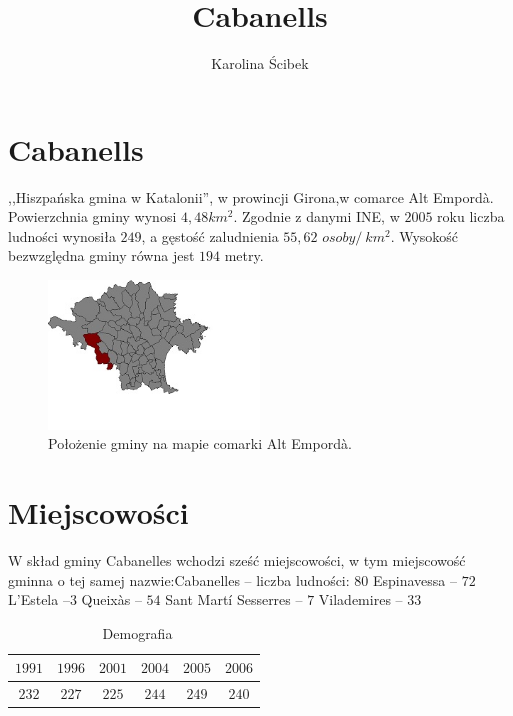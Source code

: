 \documentclass{article}
\title{Cabanells}
\author{Karolina Ścibek}
\begin{document}
\maketitle

\section{Cabanells}
,,Hiszpańska gmina w Katalonii'', w prowincji Girona,w comarce Alt Empordà.
Powierzchnia gminy wynosi $4,48km^2$. Zgodnie z danymi INE, w $2005$ roku liczba ludności wynosiła $249$, a gęstość zaludnienia $55,62$ $osoby/\ km^2$. Wysokość bezwzględna gminy równa jest $194$ metry.
\begin{figure}[h!]
\includegraphics[width=0.5\textwidth]{mapacabanelles.jpg}
\caption{Położenie gminy na mapie comarki Alt Empordà.}
\centering
\end{figure}


\section{Miejscowości}
W skład gminy Cabanelles wchodzi sześć miejscowości, w tym miejscowość gminna o tej samej nazwie:Cabanelles – liczba ludności: $80$
Espinavessa – $72$
L'Estela –$ 3$
Queixàs – $54$
Sant Martí Sesserres – $7$
Vilademires – $33$

\begin{table}[here]
\centering \caption{\ Demografia }
\begin{tabular}{cccccc}
$1991$ & $1996$ &  $2001$ &$2004$ & $2005$ & $2006$\\
\hline
$232$ & $227$ & $225$ & $244$ & $249$ & $240$\\
\end{tabular}
\end{table}






 
\end{document}
